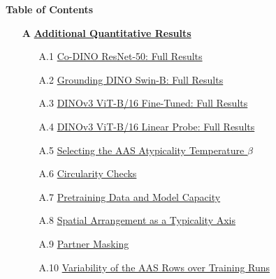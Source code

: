 \noindent\textbf{Table of Contents}
\begin{itemize}[leftmargin=*,itemsep=8pt,topsep=6pt,parsep=0pt]
  \item[\textbf{A}] \textbf{\hyperref[app:additional_results]{Additional Quantitative Results}} \dotfill\pageref{app:additional_results}
    \begin{itemize}[leftmargin=2em,itemsep=2pt,topsep=3pt,parsep=0pt,label={}]
      \item[A.1] \hyperref[app:codino_full]{Co-DINO ResNet-50: Full Results} \dotfill\pageref{app:codino_full}
      \item[A.2] \hyperref[app:gdino_full]{Grounding DINO Swin-B: Full Results} \dotfill\pageref{app:gdino_full}
      \item[A.3] \hyperref[app:dinov3_full]{DINOv3 ViT-B/16 Fine-Tuned: Full Results} \dotfill\pageref{app:dinov3_full}
      \item[A.4] \hyperref[app:dinov3_lp]{DINOv3 ViT-B/16 Linear Probe: Full Results} \dotfill\pageref{app:dinov3_lp}
      \item[A.5] \hyperref[app:beta_sweep]{Selecting the AAS Atypicality Temperature $\beta$} \dotfill\pageref{app:beta_sweep}
      \item[A.6] \hyperref[app:circularity]{Circularity Checks} \dotfill\pageref{app:circularity}%
      \item[A.7] \hyperref[app:scale_ladder]{Pretraining Data and Model Capacity} \dotfill\pageref{app:scale_ladder}%
      \item[A.8] \hyperref[app:spatial-arrangement]{Spatial Arrangement as a Typicality Axis} \dotfill\pageref{app:spatial-arrangement}%
      \item[A.9] \hyperref[app:partner_mask]{Partner Masking} \dotfill\pageref{app:partner_mask}%
      \item[A.10] \hyperref[app:aas_draws]{Variability of the AAS Rows over Training Runs} \dotfill\pageref{app:aas_draws}%
    \end{itemize}


\end{itemize}
